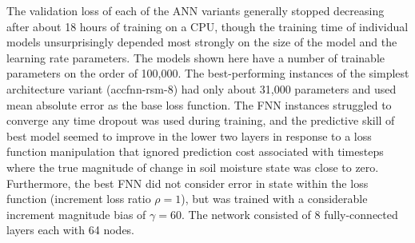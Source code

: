 The validation loss of each of the ANN variants generally stopped decreasing after about 18 hours of training on a CPU, though the training time of individual models unsurprisingly depended most strongly on the size of the model and the learning rate parameters. The models shown here have a number of trainable parameters on the order of 100,000. The best-performing instances of the simplest architecture variant (accfnn-rsm-8) had only about 31,000 parameters and used mean absolute error as the base loss function. The FNN instances struggled to converge any time dropout was used during training, and the predictive skill of best model seemed to improve in the lower two layers in response to a loss function manipulation that ignored prediction cost associated with timesteps where the true magnitude of change in soil moisture state was close to zero. Furthermore, the best FNN did not consider error in state within the loss function (increment loss ratio $\rho = 1$), but was trained with a considerable increment magnitude bias of $\gamma = 60$. The network consisted of 8 fully-connected layers each with 64 nodes.

